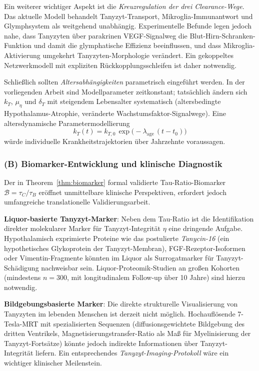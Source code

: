 ﻿\documentclass[12pt,a4paper]{article}
\theoremstyle{definition}
\begin{document}
	Ein weiterer wichtiger Aspekt ist die \emph{Kreuzregulation der drei Clearance-Wege}. Das aktuelle Modell behandelt Tanyzyt-Transport, Mikroglia-Immunantwort und Glymphsystem als weitgehend unabhängig. Experimentelle Befunde legen jedoch nahe, dass Tanyzyten über parakrinen VEGF-Signalweg die Blut-Hirn-Schranken-Funktion und damit die glymphatische Effizienz beeinflussen, und dass Mikroglia-Aktivierung umgekehrt Tanyzyten-Morphologie verändert. Ein gekoppeltes Netzwerkmodell mit expliziten Rückkopplungsschleifen ist daher notwendig.

	Schließlich sollten \emph{Altersabhängigkeiten} parametrisch eingeführt werden. In der vorliegenden Arbeit sind Modellparameter zeitkonstant; tatsächlich ändern sich $k_T$, $\mu_\eta$ und $\delta_T$ mit steigendem Lebensalter systematisch (altersbedingte Hypothalamus-Atrophie, veränderte Wachstumsfaktor-Signalwege). Eine altersdynamische Parametermodellierung
	\[
	k_T(t) = k_{T,0}\,\exp\!\bigl(-\lambda_{\text{age}}\,(t - t_0)\bigr)
	\]
	würde individuelle Krankheitstrajektor\-ien über Jahrzehnte voraussagen.

	\subsubsection*{(B) Biomarker-Entwicklung und klinische Diagnostik}

	Der in Theorem~\ref{thm:biomarker} formal validierte Tau-Ratio-Biomarker $\mathcal{B} = \tau_C/\tau_B$ eröffnet unmittelbare klinische Perspektiven, erfordert jedoch umfangreiche translationelle Validierungsarbeit.

	\textbf{Liquor-basierte Tanyzyt-Marker}: Neben dem Tau-Ratio ist die Identifikation direkter molekularer Marker für Tanyzyt-Integrität $\eta$ eine dringende Aufgabe. Hypothalamisch exprimierte Proteine wie das postulierte \emph{Tanycin-16} (ein hypothetisches Glykoprotein der Tanyzyt-Membran), FGF-Rezeptor-Isoformen oder Vimentin-Fragmente könnten im Liquor als Surrogatmarker für Tanyzyt-Schädigung nachweisbar sein. Liquor-Proteomik-Studien an großen Kohorten (mindestens $n = 300$, mit longitudinalem Follow-up über 10 Jahre) sind hierzu notwendig.

	\textbf{Bildgebungsbasierte Marker}: Die direkte strukturelle Visualisierung von Tanyzyten im lebenden Menschen ist derzeit nicht möglich. Hochauflösende 7-Tesla-MRT mit spezialisierten Sequenzen (diffusionsgewichtete Bildgebung des dritten Ventrikels, Magnetisierungstransfer-Ratio als Maß für Myelinisierung der Tanyzyt-Fortsätze) könnte jedoch indirekte Informationen über Tanyzyt-Integrität liefern. Ein entsprechendes \emph{Tanyzyt-Imaging-Protokoll} wäre ein wichtiger klinischer Meilenstein.
\end{document}
